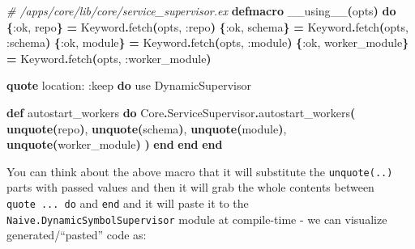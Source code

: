 \documentclass[
  oneside]{book}
\newenvironment{Shaded}{\begin{snugshade}}{\end{snugshade}}
\newcommand{\CommentTok}[1]{\textcolor[rgb]{0.56,0.35,0.01}{\textit{#1}}}
\newcommand{\ConstantTok}[1]{\textcolor[rgb]{0.56,0.35,0.01}{#1}}
\newcommand{\FunctionTok}[1]{\textcolor[rgb]{0.13,0.29,0.53}{\textbf{#1}}}
\newcommand{\ImportTok}[1]{#1}
\newcommand{\KeywordTok}[1]{\textcolor[rgb]{0.13,0.29,0.53}{\textbf{#1}}}
\newcommand{\NormalTok}[1]{#1}
\newcommand{\OperatorTok}[1]{\textcolor[rgb]{0.81,0.36,0.00}{\textbf{#1}}}
\newcommand{\VariableTok}[1]{\textcolor[rgb]{0.00,0.00,0.00}{#1}}
\begin{document}
\begin{Shaded}
\begin{Highlighting}[]
  \CommentTok{\# /apps/core/lib/core/service\_supervisor.ex}
  \KeywordTok{defmacro}\NormalTok{ \_\_using\_\_}\FunctionTok{(}\NormalTok{opts}\FunctionTok{)} \KeywordTok{do}
    \FunctionTok{\{}\VariableTok{:ok}\NormalTok{, repo}\FunctionTok{\}} \OperatorTok{=} \ConstantTok{Keyword}\OperatorTok{.}\NormalTok{fetch}\FunctionTok{(}\NormalTok{opts, }\VariableTok{:repo}\FunctionTok{)}
    \FunctionTok{\{}\VariableTok{:ok}\NormalTok{, schema}\FunctionTok{\}} \OperatorTok{=} \ConstantTok{Keyword}\OperatorTok{.}\NormalTok{fetch}\FunctionTok{(}\NormalTok{opts, }\VariableTok{:schema}\FunctionTok{)}
    \FunctionTok{\{}\VariableTok{:ok}\NormalTok{, module}\FunctionTok{\}} \OperatorTok{=} \ConstantTok{Keyword}\OperatorTok{.}\NormalTok{fetch}\FunctionTok{(}\NormalTok{opts, }\VariableTok{:module}\FunctionTok{)}
    \FunctionTok{\{}\VariableTok{:ok}\NormalTok{, worker\_module}\FunctionTok{\}} \OperatorTok{=} \ConstantTok{Keyword}\OperatorTok{.}\NormalTok{fetch}\FunctionTok{(}\NormalTok{opts, }\VariableTok{:worker\_module}\FunctionTok{)}

    \KeywordTok{quote} \VariableTok{location:} \VariableTok{:keep} \KeywordTok{do}
      \ImportTok{use} \ConstantTok{DynamicSupervisor}

      \KeywordTok{def}\NormalTok{ autostart\_workers }\KeywordTok{do}
        \ConstantTok{Core}\OperatorTok{.}\ConstantTok{ServiceSupervisor}\OperatorTok{.}\NormalTok{autostart\_workers}\FunctionTok{(}
          \KeywordTok{unquote}\FunctionTok{(}\NormalTok{repo}\FunctionTok{)}\NormalTok{,}
          \KeywordTok{unquote}\FunctionTok{(}\NormalTok{schema}\FunctionTok{)}\NormalTok{,}
          \KeywordTok{unquote}\FunctionTok{(}\NormalTok{module}\FunctionTok{)}\NormalTok{,}
          \KeywordTok{unquote}\FunctionTok{(}\NormalTok{worker\_module}\FunctionTok{)}
        \FunctionTok{)}
      \KeywordTok{end}
    \KeywordTok{end}
  \KeywordTok{end}
\end{Highlighting}
\end{Shaded}

You can think about the above macro that it will substitute the \texttt{unquote(..)} parts with passed values and then it will grab the whole contents between \texttt{quote\ ...\ do} and \texttt{end} and it will paste it to the \texttt{Naive.DynamicSymbolSupervisor} module at compile-time - we can visualize generated/``pasted'' code as:
\end{document}
